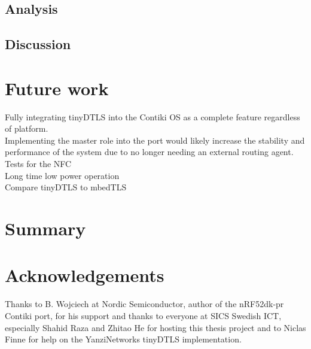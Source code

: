 \documentclass{article}
\begin{document}
\subsection{Analysis}
\subsection{Discussion}

\section{Future work}
Fully integrating tinyDTLS into the Contiki OS as a complete feature regardless of platform.\\
Implementing the master role into the port would likely increase the stability and performance of the system due to no longer needing an external routing agent.\\
Tests for the NFC\\
Long time low power operation\\
Compare tinyDTLS to mbedTLS\\
\section{Summary}

\section{Acknowledgements}
Thanks to B. Wojciech at Nordic Semiconductor, author of the nRF52dk-pr Contiki port, for his support and thanks to everyone at SICS Swedish ICT, especially Shahid Raza and Zhitao He for hosting this thesis project and to Niclas Finne for help on the YanziNetworks tinyDTLS implementation.
\end{document}
